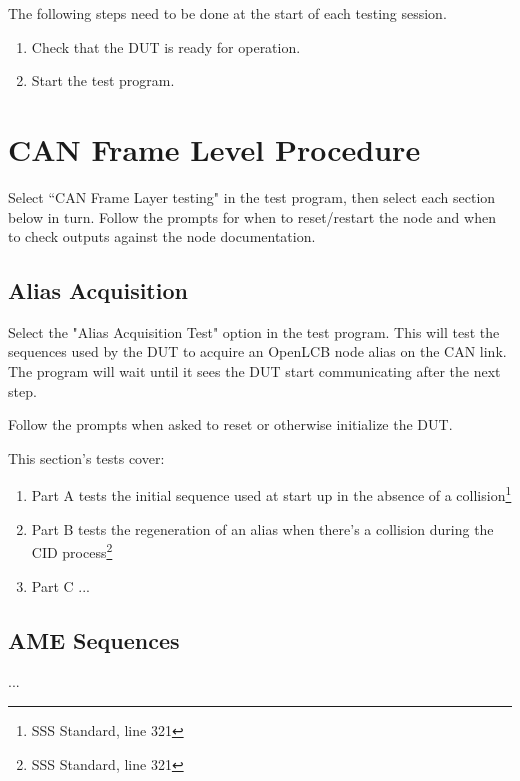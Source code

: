\documentclass[11pt]{article}
\begin{document}
The following steps need to be done at the start of each testing session.
\begin{enumerate}
\item Check that the DUT is ready for operation.
\item Start the test program.
\end{enumerate}

\section{CAN Frame Level Procedure}

Select ``CAN Frame Layer testing" in the test program, 
then select each section below in turn.  Follow the prompts
for when to reset/restart the node and when to check 
outputs against the node documentation.

\subsection{Alias Acquisition}
Select the "Alias Acquisition Test" option in the test program. 
This will test the sequences used by the DUT to acquire an OpenLCB node alias on the CAN link. 
The program will wait until it sees the DUT start communicating after the next step.

Follow the prompts when asked to reset or otherwise initialize the DUT.

This section's tests cover:

\begin{enumerate}
\item Part A tests the initial sequence used at start up in the absence of a collision\footnote{SSS Standard, line 321}
\item Part B tests the regeneration of an alias when there's a collision during the CID process\footnote{SSS Standard, line 321}
\item Part C ...
	\end{enumerate}


\subsection{AME Sequences}

...
\end{document}
